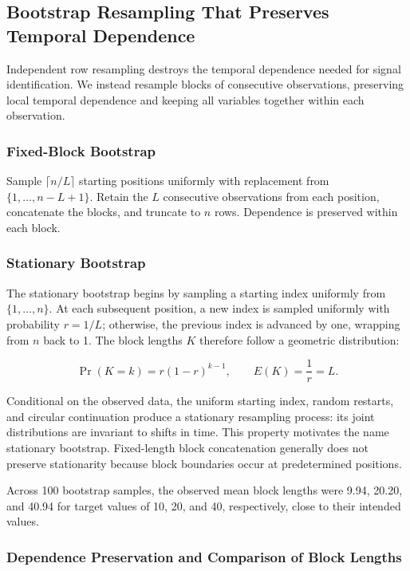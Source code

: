 \documentclass[
  english,
  11pt,
  a4paper,
]{article}
\begin{document}
\subsection{Bootstrap Resampling That Preserves Temporal
Dependence}\label{bootstrap-resampling-that-preserves-temporal-dependence}

Independent row resampling destroys the temporal dependence needed for
signal identification. We instead resample blocks of consecutive
observations, preserving local temporal dependence and keeping all
variables together within each observation.

\subsubsection{Fixed-Block Bootstrap}\label{fixed-block-bootstrap}

Sample \(\lceil n/L\rceil\) starting positions uniformly with
replacement from \(\{1,\ldots,n-L+1\}\). Retain the \(L\) consecutive
observations from each position, concatenate the blocks, and truncate to
\(n\) rows. Dependence is preserved within each block.

\subsubsection{Stationary Bootstrap}\label{stationary-bootstrap}

The stationary bootstrap begins by sampling a starting index uniformly
from \(\{1,\ldots,n\}\). At each subsequent position, a new index is
sampled uniformly with probability \(r=1/L\); otherwise, the previous
index is advanced by one, wrapping from \(n\) back to 1. The block
lengths \(K\) therefore follow a geometric distribution:

\[
\Pr(K=k)=r(1-r)^{k-1},\qquad E(K)=\frac{1}{r}=L.
\]

Conditional on the observed data, the uniform starting index, random
restarts, and circular continuation produce a stationary resampling
process: its joint distributions are invariant to shifts in time. This
property motivates the name stationary bootstrap. Fixed-length block
concatenation generally does not preserve stationarity because block
boundaries occur at predetermined positions.

Across 100 bootstrap samples, the observed mean block lengths were 9.94,
20.20, and 40.94 for target values of 10, 20, and 40, respectively,
close to their intended values.

\subsubsection{Dependence Preservation and Comparison of Block
Lengths}\label{dependence-preservation-and-comparison-of-block-lengths}
\end{document}
